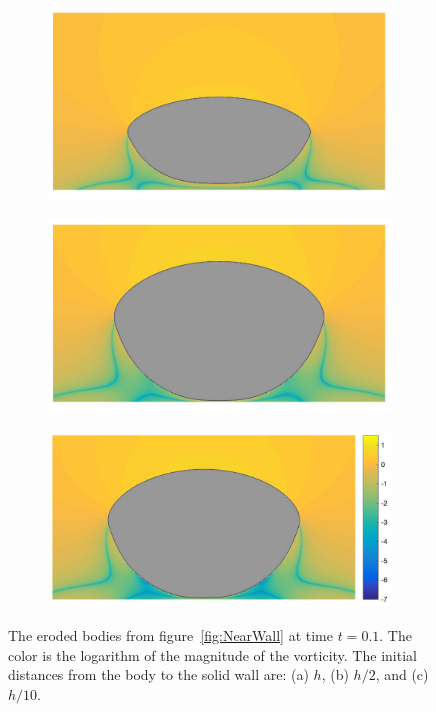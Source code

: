 \documentclass{jfm}
\begin{document}
\begin{figure}
\begin{center}
\begin{subfigure}[b]{0.32\textwidth}
\includegraphics[height = 0.53\textwidth]{./figs/1b_0d4r1h_vort}
\caption{}
\end{subfigure}
\begin{subfigure}[b]{0.32\textwidth}
\includegraphics[height = 0.53\textwidth]{./figs/1b_0d4r0d5h_vort}
\caption{}
\end{subfigure}
\begin{subfigure}[b]{0.32\textwidth}
\includegraphics[height = 0.53\textwidth]{./figs/1b_0d4r0d1h_vort}
\caption{}
\end{subfigure}
\caption{\label{fig:NearWall_vort} The eroded bodies from
figure~\ref{fig:NearWall} at time $t=0.1$. The color is the logarithm of
the magnitude of the vorticity. The initial distances from the body to
the solid wall are: (a) $h$, (b) $h/2$, and (c) $h/10$.}
\end{center}
\end{figure}
\end{document}
